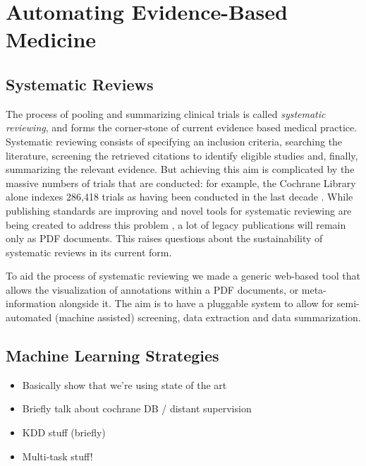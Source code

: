 \documentclass[runningheads,a4paper]{llncs}
\begin{document}
\section{Automating Evidence-Based Medicine}
\label{section:EBM-ML}

\subsection{Systematic Reviews}
The process of pooling and summarizing clinical trials is called \emph{systematic reviewing}, and forms the corner-stone of current evidence based medical practice.
Systematic reviewing consists of specifying an inclusion criteria, searching the literature, screening the retrieved citations to identify eligible studies and, finally, summarizing the relevant evidence.
But achieving this aim is complicated by the massive numbers of trials that are conducted: for example, the Cochrane Library alone indexes 286,418 trials as having been conducted in the last decade \cite{valkenhoef2012}.
While publishing standards are improving and novel tools for systematic reviewing are being created to address this problem , a lot of legacy publications will remain only as PDF documents.
This raises questions about the sustainability of systematic reviews in its current form.

To aid the process of systematic reviewing we made a generic web-based tool that allows the visualization of annotations within a PDF documents, or meta-information alongside it.
The aim is to have a pluggable system to allow for semi-automated (machine assisted) screening, data extraction and data summarization.

\subsection{Machine Learning Strategies}

\begin{itemize}
\item Basically show that we're using state of the art
\item Briefly talk about cochrane DB / distant supervision
\item KDD stuff (briefly)
\item Multi-task stuff!
\end{itemize}
\end{document}
